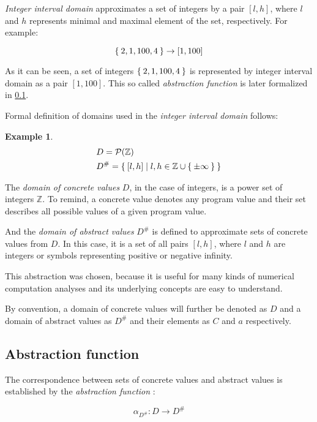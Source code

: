 \documentclass[12pt,oneside]{fithesis2}
\theoremstyle{definition}
\newtheorem{exmp}{Example}[section]
\begin{document}
\textit{Integer interval domain} approximates a set of integers by a pair $[l, h]$, where $l$ and $h$ represents minimal and maximal element of the set, respectively. For example:

\[
  \Set{ 2, 1, 100, 4 } \to [1, 100]
\]

As it can be seen, a set of integers $\Set{2, 1, 100, 4}$ is represented by integer interval domain as a pair $[1, 100]$. This so called \textit{abstraction function} is later formalized in \ref{ssec:abstraction-function}.

Formal definition of domains used in the \textit{integer interval domain} follows:

\begin{exmp}
  \begin{align*}
    &D = \mathcal P(\mathbb Z)\\
    &D^\# = \Set{[l,h] | l,h \in \mathbb{Z} \cup \Set{\pm\infty}}\\
  \end{align*}
\end{exmp}

The \textit{domain of concrete values} $D$, in the case of integers, is a power set of integers $\mathbb Z$. To remind, a concrete value denotes any program value and their set describes all possible values of a given program value.

And the \textit{domain of abstract values} $D^\#$ is defined to approximate sets of concrete values from $D$. In this case, it is a set of all pairs $[l, h]$, where $l$ and $h$ are integers or symbols representing positive or negative infinity.

This abstraction was chosen, because it is useful for many kinds of numerical computation analyses\cite{mine-AIAA10} and its underlying concepts are easy to understand.

By convention, a domain of concrete values will further be denoted as $D$ and a domain of abstract values as $D^\#$ and their elements as $C$ and $a$ respectively.

\subsection{Abstraction function}\label{ssec:abstraction-function}

The correspondence between sets of concrete values and abstract values is established by the \textit{abstraction function} \cite{CousotCousot76-1}:

\[
\alpha_{D^\#}\colon D \to D^\#
\]
\end{document}
